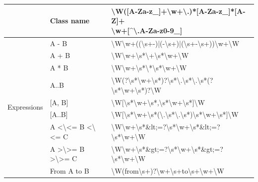 \begin{table}[h]
\begin{tabular}{|l|l|l|}
		& Class name & \shortstack[l]{\textbackslash{}W({[}A-Za-z\_{]}+\textbackslash{}w+\textbackslash{}.)*{[}A-Za-z\_{]}*{[}A-Z{]}+\\\textbackslash{}w+{[}\textasciicircum{}\textbackslash{}.A-Za-z0-9\_{]}} \\ \hline
		\multirow{11}{*}{Expressions} & A - B & \textbackslash{}W\textbackslash{}w+((\textbackslash{}s+-)|(-\textbackslash{}s+)|(\textbackslash{}s+-\textbackslash{}s+))\textbackslash{}w+\textbackslash{}W \\ \cline{2-3} 
		& A + B & \textbackslash{}W\textbackslash{}w+\textbackslash{}s*\textbackslash{}+\textbackslash{}s*\textbackslash{}w+\textbackslash{}W \\ \cline{2-3} 
		& A * B & \textbackslash{}W\textbackslash{}w+\textbackslash{}s*\textbackslash{}*\textbackslash{}s*\textbackslash{}w+\textbackslash{}W \\ \cline{2-3} 
		& A..B & \textbackslash{}W(?\textbackslash{}s*\textbackslash{}w+\textbackslash{}s*)?\textbackslash{}s*\textbackslash{}.\textbackslash{}s*\textbackslash{}.\textbackslash{}s*(?\textbackslash{}s*\textbackslash{}w+\textbackslash{}s*)?\textbackslash{}W \\ \cline{2-3} 
		& {[}A, B{]} & \textbackslash{}W[\textbackslash{}s*\textbackslash{}w+\textbackslash{}s*,\textbackslash{}s*\textbackslash{}w+\textbackslash{}s*]\textbackslash{}W \\ \cline{2-3} 
		& {[}A..B{]} & \textbackslash{}W[\textbackslash{}s*\textbackslash{}w+\textbackslash{}s*(\textbackslash{}.\textbackslash{}s*\textbackslash{}.\textbackslash{}s*)\textbackslash{}s*\textbackslash{}w+\textbackslash{}s*]\textbackslash{}W \\ \cline{2-3} 
		& A \textless{}\textbackslash{}\textless{}= B \textless{}\textbackslash{}\textless{}= C & \textbackslash{}W\textbackslash{}w+\textbackslash{}s*\&lt;=?\textbackslash{}s*\textbackslash{}w+\textbackslash{}s*\&lt;=?\textbackslash{}s*\textbackslash{}w+\textbackslash{}W \\ \cline{2-3} 
		& A \textgreater{}\textbackslash{}\textgreater{}= B \textgreater{}\textbackslash{}\textgreater{}= C & \textbackslash{}W\textbackslash{}w+\textbackslash{}s*\&gt;=?\textbackslash{}s*\textbackslash{}w+\textbackslash{}s*\&gt;=?\textbackslash{}s*\textbackslash{}w+\textbackslash{}W \\ \cline{2-3} 
		& From A to B & \textbackslash{}W(from\textbackslash{}s+)?\textbackslash{}w+\textbackslash{}s+to\textbackslash{}s+\textbackslash{}w+\textbackslash{}W \\ \cline{2-3} 

\end{tabular}
\end{table}
